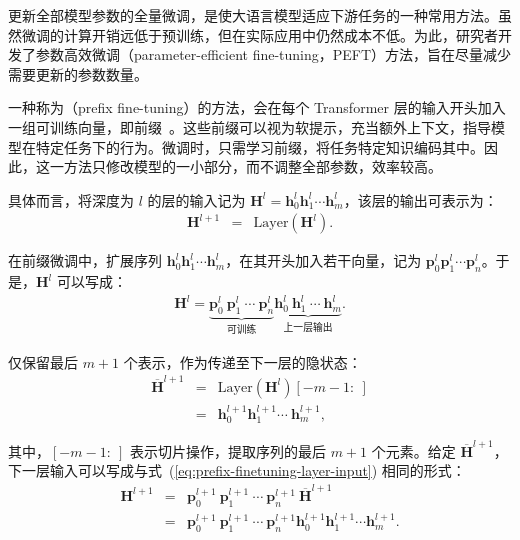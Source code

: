 \noindent 更新全部模型参数的全量微调，是使大语言模型适应下游任务的一种常用方法。虽然微调的计算开销远低于预训练，但在实际应用中仍然成本不低。为此，研究者开发了参数高效微调（parameter-efficient fine-tuning，PEFT）方法，旨在尽量减少需要更新的参数数量。

一种称为（prefix fine-tuning）的方法，会在每个 Transformer 层的输入开头加入一组可训练向量，即前缀~\cite{li-liang:2021prefix}。这些前缀可以视为软提示，充当额外上下文，指导模型在特定任务下的行为。微调时，只需学习前缀，将任务特定知识编码其中。因此，这一方法只修改模型的一小部分，而不调整全部参数，效率较高。

具体而言，将深度为 $l$ 的层的输入记为 $\mathbf{H}^l = \mathbf{h}_0^l \mathbf{h}_1^l \cdots \mathbf{h}_m^l$，该层的输出可表示为：
\begin{eqnarray}
\mathbf{H}^{l+1} & = & \mathrm{Layer}(\mathbf{H}^{l}).
\end{eqnarray}

在前缀微调中，扩展序列 $\mathbf{h}_0^l \mathbf{h}_1^l \cdots \mathbf{h}_m^l$，在其开头加入若干向量，记为 $\mathbf{p}_0^l \mathbf{p}_1^l \cdots \mathbf{p}_n^l$。于是，$\mathbf{H}^l$ 可以写成：
\begin{eqnarray}
\mathbf{H}^l = \underbrace{\mathbf{p}_0^l\ \mathbf{p}_1^l\ \cdots\ \mathbf{p}_n^l}_{\text{可训练}} \underbrace{\mathbf{h}_0^l\ \mathbf{h}_1^l\ \cdots\ \mathbf{h}_m^l}_{\text{上一层输出}}. \label{eq:prefix-finetuning-layer-input}
\end{eqnarray}

\noindent 仅保留最后 $m+1$ 个表示，作为传递至下一层的隐状态：
\begin{eqnarray}
\overline{\mathbf{H}}^{l+1} & = & \mathrm{Layer}(\mathbf{H}^{l})[-m-1:\ ] \nonumber \\
                       & = & \mathbf{h}_0^{l+1}\mathbf{h}_1^{l+1}\cdots\ \mathbf{h}_m^{l+1},
\end{eqnarray}

\noindent 其中，$[-m-1:\ ]$ 表示切片操作，提取序列的最后 $m+1$ 个元素。给定 $\overline{\mathbf{H}}^{l+1}$，下一层输入可以写成与式~(\ref{eq:prefix-finetuning-layer-input}) 相同的形式：
\begin{eqnarray}
\mathbf{H}^{l+1} & = & \mathbf{p}_0^{l+1}\ \mathbf{p}_1^{l+1}\ \cdots\ \mathbf{p}_n^{l+1}\ \overline{\mathbf{H}}^{l+1} \nonumber \\
                 & = & \mathbf{p}_0^{l+1}\ \mathbf{p}_1^{l+1}\ \cdots\ \mathbf{p}_n^{l+1} \mathbf{h}_0^{l+1}\mathbf{h}_1^{l+1}\cdots \mathbf{h}_m^{l+1}.
\end{eqnarray}


